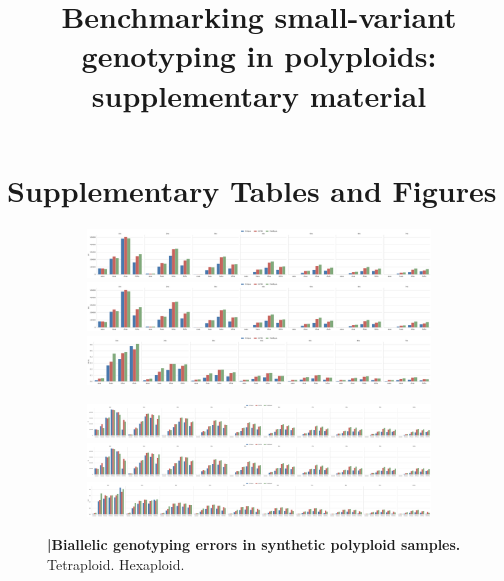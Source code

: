 \documentclass{article}
\title{Benchmarking small-variant genotyping in polyploids: supplementary material}
\author{}
\date{}
\begin{document}
\maketitle



\section{Supplementary Tables and Figures}

\begin{figure}
    \centering
\captionsetup[subfigure]{position=top,labelfont=bf,textfont=normalfont,singlelinecheck=off,justification=raggedright}
    \begin{subfigure}[b]{\textwidth}
        \caption{}
        \includegraphics[width=\textwidth]{figures/tetraploid_gt_fp}
        \includegraphics[width=\textwidth]{figures/tetraploid_gt_fn}
        \includegraphics[width=\textwidth]{figures/tetraploid_gt_fn_perc}
        \label{fig:polyploid-genotyping-accuracy:tetraploid}
    \end{subfigure}
    \begin{subfigure}[b]{\textwidth}
        \caption{}
        \includegraphics[width=\textwidth]{figures/hexaploid_gt_fp}
        \includegraphics[width=\textwidth]{figures/hexaploid_gt_fn}
        \includegraphics[width=\textwidth]{figures/hexaploid_gt_fn_perc}
        \label{fig:polyploid-genotyping-accuracy:hexaploid}
    \end{subfigure}
     \caption{\textbf{|\:Biallelic genotyping errors in synthetic polyploid samples.} \protect{} Tetraploid. \protect{} Hexaploid.}
    \label{supfig:polyploid_genotyping_accuracy}
\end{figure}
\end{document}
